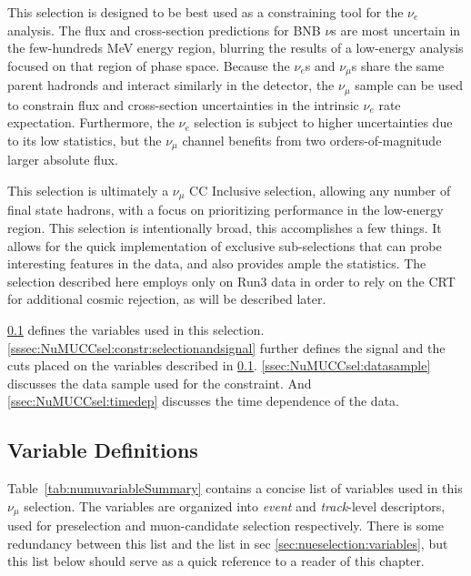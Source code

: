 \label{sec:NuMUCCsel}

\par This selection is designed to be best used as a constraining tool for the $\nu_e$ analysis. The flux and cross-section predictions for BNB $\nu$s are most uncertain in the few-hundreds MeV energy region, blurring the results of a low-energy analysis focused on that region of phase space. Because the $\nu_e$s and $\nu_{\mu}$s share the same parent hadronds and interact similarly in the detector, the $\nu_{\mu}$ sample can be used to constrain flux and cross-section uncertainties in the intrinsic $\nu_e$ rate expectation. Furthermore, the $\nu_{e}$ selection is subject to higher uncertainties due to its low statistics, but the $\nu_{\mu}$ channel benefits from two orders-of-magnitude larger absolute flux.

\par This selection is ultimately a $\nu_{\mu}$ CC Inclusive selection, allowing any number of final state hadrons, with a focus on prioritizing performance in the low-energy region. This selection is intentionally broad, this accomplishes a few things. It allows for the quick implementation of exclusive sub-selections that can probe interesting features in the data, and also provides ample the statistics. The selection described here employs only on Run3 data in order to rely on the CRT for additional cosmic rejection, as will be described later. %

\par \cref{ssec:NuMUCCsel:sel:vars} defines the variables used in this selection. \cref{sssec:NuMUCCsel:constr:selectionandsignal} further defines the signal and the cuts placed on the variables described in \cref{ssec:NuMUCCsel:sel:vars}. \cref{ssec:NuMUCCsel:datasample} discusses the data sample used for the constraint. And \cref{ssec:NuMUCCsel:timedep} discusses the time dependence of the data.

\subsection{Variable Definitions}
\label{ssec:NuMUCCsel:sel:vars}

\par Table~\ref{tab:numuvariableSummary} contains a concise list of variables used in this $\nu_{\mu}$ selection. The variables are organized into \textit{event} and \textit{track}-level descriptors, used for preselection and muon-candidate selection respectively. There is some redundancy between this list and the list in sec \ref{sec:nueselection:variables}, but this list below should serve as a quick reference to a reader of this chapter.

